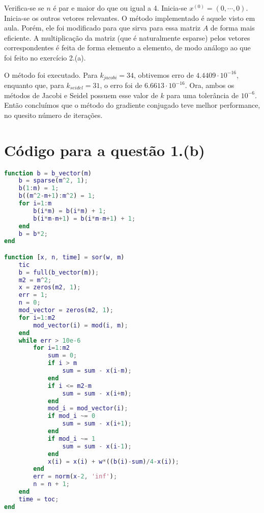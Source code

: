 \documentclass{article}
\begin{document}
\begin{enumerate}
\begin{enumerate}
                    Verifica-se se $n$ é par e maior do que ou igual a 4.
                    Inicia-se $x^{(0)} = (0, \cdots, 0)$. Inicia-se os outros vetores
                    relevantes. O método implementado é aquele visto em aula.
                    Porém, ele foi modificado para que sirva para essa matriz $A$ de forma mais eficiente.
                    A multiplicação da matriz (que é naturalmente esparse) pelos vetores correspondentes é 
                    feita de forma elemento a elemento, de modo análogo ao que foi feito
                    no exercício 2.(a).

                    O método foi executado. Para $k_{jacobi} = 34$, obtivemos erro de $4.4409\cdot 10^{-16}$,
                    enquanto que, para $k_{seidel} = 31$, o erro foi de $6.6613\cdot 10^{-16}$. Ora, ambos os métodos
                    de Jacobi e Seidel possuem esse valor de $k$ para uma tolerância de $10^{-6}$. Então concluímos que
                    o método do gradiente conjugado teve melhor performance, no quesito número
                    de iterações.
            \end{enumerate}

    \end{enumerate}

    \appendix

    \section{Código para a questão 1.(b)}
        \label{appendix:a}

        \begin{lstlisting}[language=Matlab]
function b = b_vector(m)
    b = sparse(m^2, 1);
    b(1:m) = 1;
    b((m^2-m+1):m^2) = 1;
    for i=1:m
        b(i*m) = b(i*m) + 1;
        b(i*m-m+1) = b(i*m-m+1) + 1;
    end
    b = b*2;
end

function [x, n, time] = sor(w, m)
    tic
    b = full(b_vector(m));
    m2 = m^2;
    x = zeros(m2, 1);
    err = 1;
    n = 0;
    mod_vector = zeros(m2, 1);
    for i=1:m2
        mod_vector(i) = mod(i, m);
    end
    while err > 10e-6
        for i=1:m2
            sum = 0;
            if i > m
                sum = sum - x(i-m);
            end
            if i <= m2-m
                sum = sum - x(i+m);
            end
            mod_i = mod_vector(i);
            if mod_i ~= 0
                sum = sum - x(i+1);
            end
            if mod_i ~= 1
                sum = sum - x(i-1);
            end
            x(i) = x(i) + w*((b(i)-sum)/4-x(i));
        end
        err = norm(x-2, 'inf');
        n = n + 1;
    end
    time = toc;
end
        \end{lstlisting}
\end{document}
